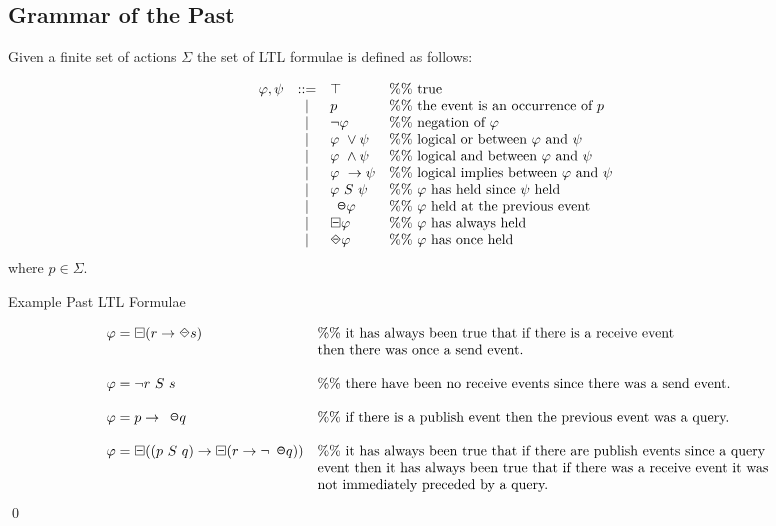 \subsection{Grammar of the Past}
\label{sec:LTLPastGrammar}

\begin{definition}Given a finite set of actions $ \Sigma $ the set of LTL formulae is defined as follows:

$$ \begin{array}{lcll}
\varphi, \psi & ::= & \top & \%\%\ \mbox{true}\
\\
& | & p & \%\%\ \mbox{the event is an occurrence of}\ p\ 
\\ 
&| & \neg\varphi & \%\%\ \mbox{negation of}\ \varphi\ 
\\
&| & \varphi\ \lor \psi & \%\%\ \mbox{logical or between}\ \varphi\ \mbox{and}\ \psi\
\\
&| & \varphi\ \land \psi & \%\%\ \mbox{logical and between}\ \varphi\ \mbox{and}\ \psi\
\\
& | & \varphi\ \rightarrow \psi & \%\%\ \mbox{logical implies between}\ \varphi\ \mbox{and}\ \psi\
\\
& | & \varphi\ S\ \psi & \%\%\ \varphi\ \mbox{has held since}\ \psi\ \mbox{held}\
\\
& | & \LTLprevious\varphi & \%\%\ \varphi\ \mbox{held at the previous event}\ 
\\
& | & \LTLalwaysbeen\varphi & \%\%\ \varphi\ \mbox{has always held}\ 
\\
& | & \LTLonce\varphi & \%\%\  \varphi\ \mbox{has once}\ \mbox{held}\ 
\end{array}$$
where $ p \in \Sigma $.
\end{definition}

\newpage

\begin{myEx} Example Past LTL Formulae

$$\begin{array}{ll}
\varphi = \LTLalwaysbeen(r \rightarrow \LTLonce s)& \%\%\ \mbox{it has always been true that if there is a receive event}\\
& \mbox{then there was once a send event.}
\\
\\
\varphi = \neg r\ S\ s& \%\%\ \mbox{there have been no receive events since there was a send event.}
\\
\\
\varphi = p \rightarrow \LTLprevious q& \%\%\ \mbox{if there is a publish event then the previous event was a query.}
\\
\\
\varphi = \LTLalwaysbeen((p \ S\ q) \rightarrow \LTLalwaysbeen(r \rightarrow \neg\LTLprevious q))& \%\% \mbox{ it has always been true that if there are publish events since a query}\\ & \mbox{event then it has always been true that if there was a receive event it was}\\ & \mbox{not immediately preceded by a query.}
\end{array}$$
\qed
\end{myEx}
